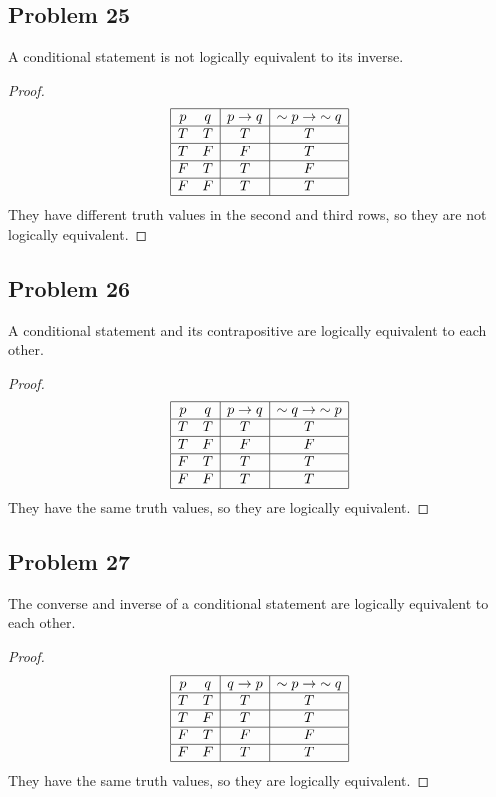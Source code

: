 \documentclass[14pt]{extarticle}
\begin{document}
\subsection{Problem 25}
A conditional statement is not logically equivalent to its inverse.

\begin{proof}
$$
\begin{array}{|cc|c|c|}
\hline
p & q & p \to q & {\sim p} \to {\sim q} \\
\hline
T & T & T & T \\
\hline
T & F & F & T \\
\hline
F & T & T & F \\
\hline
F & F & T & T \\
\hline
\end{array}
$$
They have different truth values in the second and third rows, so they are not
logically equivalent.
\end{proof}

\subsection{Problem 26}
A conditional statement and its contrapositive are logically equivalent to each
other.

\begin{proof}
$$
\begin{array}{|cc|c|c|}
\hline
p & q & p \to q & {\sim q} \to {\sim p} \\
\hline
T & T & T & T \\
\hline
T & F & F & F \\
\hline
F & T & T & T \\
\hline
F & F & T & T \\
\hline
\end{array}
$$
They have the same truth values, so they are logically equivalent.
\end{proof}

\subsection{Problem 27}
The converse and inverse of a conditional statement are logically equivalent to
each other.

\begin{proof}
$$
\begin{array}{|cc|c|c|}
\hline
p & q & q \to p & {\sim p} \to {\sim q} \\
\hline
T & T & T & T \\
\hline
T & F & T & T \\
\hline
F & T & F & F \\
\hline
F & F & T & T \\
\hline
\end{array}
$$
They have the same truth values, so they are logically equivalent.
\end{proof}
\end{document}
